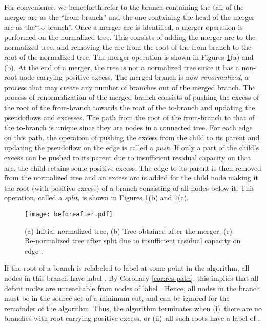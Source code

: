 \documentclass{article}
\begin{document}
For convenience, we henceforth refer to the branch containing the tail of the merger arc as the ``from-branch'' and the one containing the head of the merger arc as the``to-branch''. Once a merger arc is identified, a merger operation is performed on the normalized tree. This consists of adding the merger arc to the normalized tree, and removing the arc from the root of the from-branch to the root of the normalized tree. The merger operation is shown in Figures \ref{Figure:beforeafter}(a) and (b). At the end of a merger, the tree is not a normalized tree since it has a non-root node carrying positive excess. The merged branch is now {\em renormalized}, a process that may create any number of branches out of the merged branch. The process of renormalization of the merged branch consists of pushing the excess of the root of the from-branch towards the root of the to-branch and updating the pseudoflows and excesses. The path from the root of the from-branch to that of the to-branch is unique since they are nodes in a connected tree. For each edge on this path, the operation of pushing the excess from the child to its parent and updating the pseudoflow on the edge is called a {\em push}. If only a part of the child's excess can be pushed to its parent due to insufficient residual capacity on that arc, the child retains some positive excess. The edge to its parent is then removed from the normalized tree and an excess arc is added for the child node making it the root (with positive excess) of a branch consisting of all nodes below it. This operation, called a {\em split}, is shown in Figures \ref{Figure:beforeafter}(b) and \ref{Figure:beforeafter}(c).

\begin{figure}
\centerline{\texttt{[image: beforeafter.pdf]}}
\vspace{0.1in}
\caption{\label{Figure:beforeafter} (a) Initial normalized tree, (b) Tree obtained after the merger, (c) Re-normalized tree after split due to insufficient residual capacity on edge .}
\end{figure}

If the root of a branch is relabeled to label  at some point in the algorithm, all nodes in this branch have label . By Corollary \ref{cor:res-path}, this implies that all deficit nodes are unreachable from nodes of label . Hence, all nodes in the branch must be in the source set of a minimum cut, and can be ignored for the remainder of the algorithm. Thus, the algorithm terminates when (i)~there are no branches with root carrying positive excess, or (ii)~all such roots have a label of .
\end{document}
